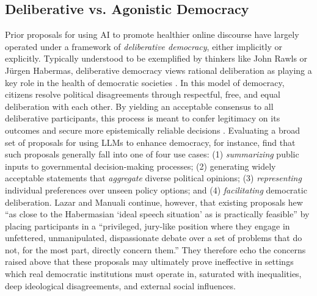 \subsection{Deliberative vs. Agonistic Democracy}\label{sec:agonistic-democracy}
Prior proposals for using AI to promote healthier online discourse have largely operated under a framework of \textit{deliberative democracy}, either implicitly or explicitly. Typically understood to be exemplified by thinkers like John Rawls or J\"urgen Habermas, deliberative democracy views rational deliberation as playing a key role in the health of democratic societies \cite{Rawls1971TheoryOfJustice, Habermas1985TheoryOfCommunicativeAction}. In this model of democracy, citizens resolve political disagreements through respectful, free, and equal deliberation with each other. By yielding an acceptable consensus to all deliberative participants, this process is meant to confer legitimacy on its outcomes and secure more epistemically reliable decisions \cite{Landemore2017EpistemicTurn}. Evaluating a broad set of proposals for using LLMs to enhance democracy, for instance, \citet{LazarAndManuali2026LLMsDemocracy} find that such proposals generally fall into one of four use cases: (1) \textit{summarizing} public inputs to governmental decision-making processes; (2) generating widely acceptable statements that \textit{aggregate} diverse political opinions; (3) \textit{representing} individual preferences over unseen policy options; and (4) \textit{facilitating} democratic deliberation. Lazar and Manuali continue, however, that existing proposals hew ``as close to the Habermasian `ideal speech situation' as is practically feasible'' by placing participants in a ``privileged, jury-like position where they engage in unfettered, unmanipulated, dispassionate debate over a set of problems that do not, for the most part, directly concern them.'' They therefore echo the concerns raised above that these proposals may ultimately prove ineffective in settings which real democratic institutions must operate in, saturated with inequalities, deep ideological disagreements, and external social influences.

